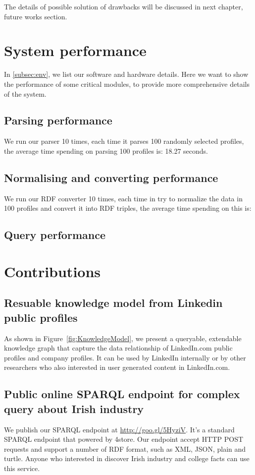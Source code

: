 The details of possible solution of drawbacks will be discussed in next chapter, future works section.

\section{System performance}

In \autoref{subsec:env}, we list our software and hardware details. Here we want to show the performance of some critical modules, to provide more comprehensive details of the system.

\subsection{Parsing performance}
We run our parser 10 times, each time it parses 100 randomly selected profiles, the average time spending on parsing 100 profiles is: 18.27 seconds.

\subsection{Normalising and converting performance}
We run our RDF converter 10 times, each time in try to normalize the data in 100 profiles and convert it into RDF triples, the average time spending on this is: 

\subsection{Query performance}

\section{Contributions}
\subsection{Resuable knowledge model from Linkedin public profiles}
As shown in Figure~\ref{fig:KnowledgeModel}, we present a queryable, extendable knowledge graph that capture the data relationship of LinkedIn.com public profiles and company profiles. It can be used by LinkedIn internally or by other researchers who also interested in user generated content in LinkedIn.com.

\subsection{Public online SPARQL endpoint for complex query about Irish industry}
We publish our SPARQL endpoint at \url{http://goo.gl/5HyziV}. It's a standard SPARQL endpoint that powered by 4store\cite{harris20094store}. Our endpoint accept HTTP POST requests and support a number of RDF format, such as XML, JSON, plain and turtle. Anyone who interested in discover Irish industry and college facts can use this service.


